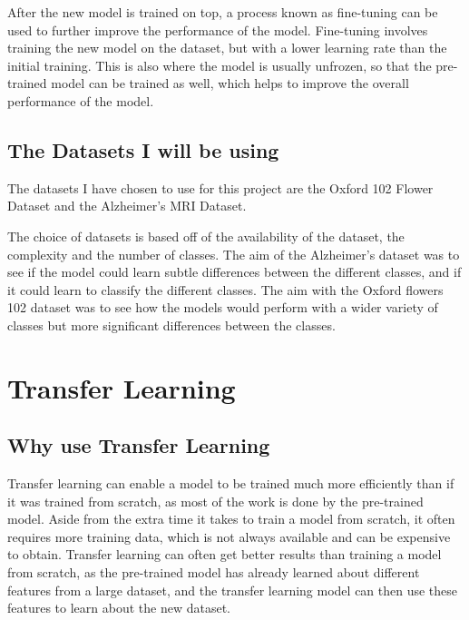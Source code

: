 \documentclass[]{final_report}
\begin{document}
After the new model is trained on top, a process known as fine-tuning can be used to further improve the performance of the model.
Fine-tuning involves training the new model on the dataset, but with a lower learning rate than the initial training.
This is also where the model is usually unfrozen, so that the pre-trained model can be trained as well, which helps to improve the overall performance of the model.

\section{The Datasets I will be using}
The datasets I have chosen to use for this project are the Oxford 102 Flower Dataset\cite{OxfordFlowers102} and the Alzheimer's MRI Dataset\cite{AlzheimersDataset}.

The choice of datasets is based off of the availability of the dataset, the complexity and the number of classes.
The aim of the Alzheimer's dataset was to see if the model could learn subtle differences between the different classes, and if it could learn to classify the different classes.
The aim with the Oxford flowers 102 dataset\cite{OxfordFlowers102} was to see how the models would perform with a wider variety of classes but more significant differences between the classes.

\chapter{Transfer Learning}

\section{Why use Transfer Learning}
Transfer learning can enable a model to be trained much more efficiently than if it was trained from scratch, as most of the work is done by the pre-trained model.
Aside from the extra time it takes to train a model from scratch, it often requires more training data, which is not always available and can be expensive to obtain.
Transfer learning can often get better results than training a model from scratch, as the pre-trained model has already learned about different features from a large dataset,
and the transfer learning model can then use these features to learn about the new dataset.
\end{document}
